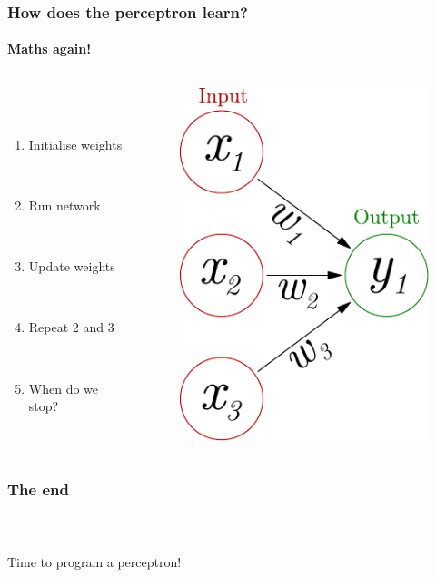 \documentclass{beamer}
\newcommand{\figheight}{0.72\textheight}
\begin{document}
\begin{frame}
\frametitle{How does the perceptron learn?}
\framesubtitle{Maths again!}
  \begin{columns}[T]
    \begin{column}{.45\textwidth} 
        \  \\
 \   \\ 
\begin{enumerate}
 \item<1-> Initialise weights
 
 \ \\
 \item<1-> Run network
 
 \ \\
 
 \item<1-> Update weights
 
  \ \\
 
 \item<1-> Repeat 2 and 3
 
 \ \\

 \item<2> When do we stop?
\end{enumerate}


    \end{column}
    \begin{column}{.55\textwidth}
\begin{figure}[t]
 \centering
 \includegraphics[height = \figheight]{./fig/perceptron_maths.pdf}
\end{figure}
    \end{column}
  \end{columns}
\end{frame}




\begin{frame}
\frametitle{The end}
\framesubtitle{}
        \  \\
 \   \\ 

 \Huge Time to program a perceptron!
\end{frame}
\end{document}
